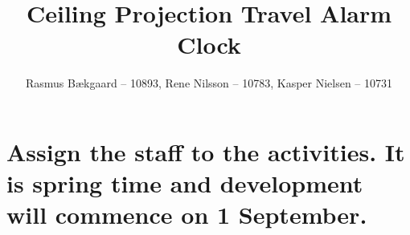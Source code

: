\documentclass[10pt]{article}
\title{Ceiling Projection Travel Alarm Clock}
\author{Rasmus Bækgaard -- 10893, Rene Nilsson -- 10783, Kasper Nielsen -- 10731}
\begin{document}
\maketitle








\section{Assign the staff to the activities. It is spring time and development will commence on 1 September.}




\end{document}
